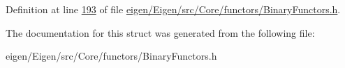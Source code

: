 Definition at line \hyperlink{eigen_2_eigen_2src_2_core_2functors_2_binary_functors_8h_source_l00193}{193} of file \hyperlink{eigen_2_eigen_2src_2_core_2functors_2_binary_functors_8h_source}{eigen/\+Eigen/src/\+Core/functors/\+Binary\+Functors.\+h}.



The documentation for this struct was generated from the following file\+:\begin{DoxyCompactItemize}
\item 
eigen/\+Eigen/src/\+Core/functors/\+Binary\+Functors.\+h\end{DoxyCompactItemize}
